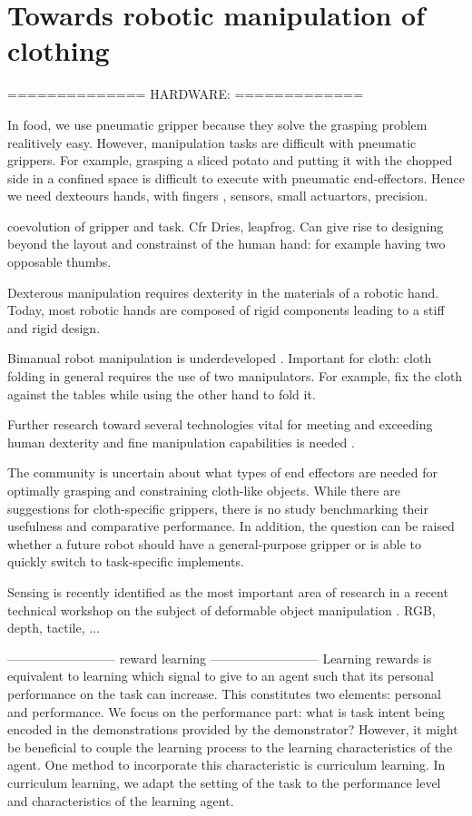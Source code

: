 \documentclass[\home/main.tex]{subfiles}
\begin{document}
\chapter{Towards robotic manipulation of clothing }\label{ch:towards_robotic_folding}


==============
HARDWARE:
=============

In food, we use pneumatic gripper because they solve the grasping problem realitively easy. However, manipulation tasks are difficult with pneumatic grippers. For example, grasping a sliced potato and putting it with the chopped side in a confined space is difficult to execute with pneumatic end-effectors. Hence we need dexteours hands, with fingers , sensors, small actuartors, precision. 

coevolution of gripper and task. Cfr Dries, leapfrog. 
Can give rise to designing beyond the layout and constrainst of the human hand: for example having two opposable thumbs. %

Dexterous manipulation requires dexterity in the materials of a robotic hand. Today, most robotic hands are composed of rigid components leading to a stiff and rigid design. %

Bimanual robot manipulation is underdeveloped \autocite{Billard2019}. Important for cloth: cloth folding in general requires the use of two manipulators. For example, fix the cloth against the tables while using the other hand to fold it. 

Further research toward several technologies vital for meeting and exceeding human dexterity and fine manipulation capabilities is needed .


 The community is uncertain about what types of end effectors are needed for optimally grasping and constraining cloth-like objects. While there are suggestions for cloth-specific grippers, there is no study benchmarking their usefulness and comparative performance. In addition, the question can be raised whether a future robot should have a general-purpose gripper or is able to quickly switch to  task-specific implements.  

 Sensing is recently identified as the most important area of research in a recent technical workshop on the subject of deformable object manipulation \autocite{zhu:hal-02980281}. RGB, depth, tactile, ... 


--------------------------
    reward learning
--------------------------
Learning rewards is equivalent to learning which signal to give to an agent such that its personal performance on the task can increase. This constitutes two elements: personal and performance. We focus on the performance part: what is task intent being encoded in the demonstrations provided by the demonstrator? However, it might be beneficial to couple the learning process to the learning characteristics of the agent. One method to incorporate this characteristic is curriculum learning. In curriculum learning, we adapt the setting of the task to the performance level and characteristics of the learning agent.  
\end{document}
